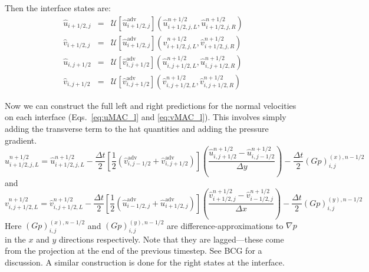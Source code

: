 Then the interface states are:
\begin{eqnarray}
\hat{u}_{i+1/2,j} &=& \mathcal{U}[\hat{u}_{i+1/2,j}^\mathrm{adv}]
             (\hat{u}_{i+1/2,j,L}^{n+1/2}, \hat{u}_{i+1/2,j,R}^{n+1/2} ) \\
\hat{v}_{i+1/2,j} &=& \mathcal{U}[\hat{u}_{i+1/2,j}^\mathrm{adv}]
             (\hat{v}_{i+1/2,j,L}^{n+1/2}, \hat{v}_{i+1/2,j,R}^{n+1/2} ) \\
\hat{u}_{i,j+1/2} &=& \mathcal{U}[\hat{v}_{i,j+1/2}^\mathrm{adv}]
             (\hat{u}_{i,j+1/2,L}^{n+1/2}, \hat{u}_{i,j+1/2,R}^{n+1/2} ) \\
\hat{v}_{i,j+1/2} &=& \mathcal{U}[\hat{v}_{i,j+1/2}^\mathrm{adv}]
             (\hat{v}_{i,j+1/2,L}^{n+1/2}, \hat{v}_{i,j+1/2,R}^{n+1/2} ) 
\end{eqnarray}

Now we can construct the full left and right predictions for the
normal velocities on each interface (Eqs.~\ref{eq:uMAC_l} and
\ref{eq:vMAC_l}).  This involves simply adding the transverse term to
the hat quantities and adding the pressure gradient.
\begin{equation}
u_{i+1/2,j,L}^{n+1/2} = \hat{u}_{i+1/2,j,L}^{n+1/2} 
    - \frac{\Delta t}{2} 
       \left [ \frac{1}{2} \left (\hat{v}^\mathrm{adv}_{i,j-1/2} +
                                  \hat{v}^\mathrm{adv}_{i,j+1/2} \right )
      \right ]
      \left ( \frac{\hat{u}_{i,j+1/2}^{n+1/2} - 
                    \hat{u}_{i,j-1/2}^{n+1/2}}{\Delta y} \right )
    - \frac{\Delta t}{2} (Gp)^{(x),n-1/2}_{i,j}
\end{equation}
and
\begin{equation}
v_{i,j+1/2,L}^{n+1/2} = \hat{v}_{i,j+1/2,L}^{n+1/2} 
    - \frac{\Delta t}{2} 
       \left [ \frac{1}{2} \left (\hat{u}^\mathrm{adv}_{i-1/2,j} +
                                  \hat{u}^\mathrm{adv}_{i+1/2,j} \right )
      \right ]
      \left ( \frac{\hat{v}_{i+1/2,j}^{n+1/2} - 
                    \hat{v}_{i-1/2,j}^{n+1/2}}{\Delta x} \right )
    - \frac{\Delta t}{2} (Gp)^{(y),n-1/2}_{i,j}
\end{equation}
Here $ (Gp)^{(x),n-1/2}_{i,j}$ and $ (Gp)^{(y),n-1/2}_{i,j}$ are
difference-approximations to $\nabla p$ in the $x$ and $y$
directions respectively.  Note that they are lagged---these come from
the projection at the end of the previous timestep.  See BCG for
a discussion.  A similar
construction is done for the right states at the interface.

